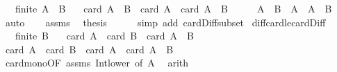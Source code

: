 \begin{isabellebody}
\ \ \ {\isachardoublequoteopen}finite\ {\isacharparenleft}{\kern0pt}A\ {\isasyminter}\ B{\isacharparenright}{\kern0pt}{\isachardoublequoteclose}\isanewline
\ \ \ {\isachardoublequoteopen}card\ {\isacharparenleft}{\kern0pt}A\ {\isacharminus}{\kern0pt}\ B{\isacharparenright}{\kern0pt}\ {\isacharequal}{\kern0pt}\ card\ A\ {\isacharminus}{\kern0pt}\ card\ {\isacharparenleft}{\kern0pt}A\ {\isasyminter}\ B{\isacharparenright}{\kern0pt}{\isachardoublequoteclose}\isanewline
%
\isadelimproof
%
\endisadelimproof
%
\isatagproof
{}\isamarkupfalse%
\ {\isacharminus}{\kern0pt}\isanewline
\ \ \isamarkupfalse%
\ {\isachardoublequoteopen}A\ {\isacharminus}{\kern0pt}\ B\ {\isacharequal}{\kern0pt}\ A\ {\isacharminus}{\kern0pt}\ A\ {\isasyminter}\ B{\isachardoublequoteclose}\ \isamarkupfalse%
\ auto\isanewline
\ \ \isamarkupfalse%
\ assms\ \isamarkupfalse%
\ {\isacharquery}{\kern0pt}thesis\isanewline
\ \ \ \ \isamarkupfalse%
\ {\isacharparenleft}{\kern0pt}simp\ add{\isacharcolon}{\kern0pt}\ card{\isacharunderscore}{\kern0pt}Diff{\isacharunderscore}{\kern0pt}subset{\isacharparenright}{\kern0pt}\isanewline
{}\isamarkupfalse%
%
\endisatagproof
{\isafoldproof}%
%
\isadelimproof
\isanewline
%
\endisadelimproof
\isanewline
{}\isamarkupfalse%
\ diff{\isacharunderscore}{\kern0pt}card{\isacharunderscore}{\kern0pt}le{\isacharunderscore}{\kern0pt}card{\isacharunderscore}{\kern0pt}Diff{\isacharcolon}{\kern0pt}\isanewline
\ \ \ {\isachardoublequoteopen}finite\ B{\isachardoublequoteclose}\isanewline
\ \ \ {\isachardoublequoteopen}card\ A\ {\isacharminus}{\kern0pt}\ card\ B\ {\isasymle}\ card\ {\isacharparenleft}{\kern0pt}A\ {\isacharminus}{\kern0pt}\ B{\isacharparenright}{\kern0pt}{\isachardoublequoteclose}\isanewline
%
\isadelimproof
%
\endisadelimproof
%
\isatagproof
{}\isamarkupfalse%
\ {\isacharminus}{\kern0pt}\isanewline
\ \ \isamarkupfalse%
\ {\isachardoublequoteopen}card\ A\ {\isacharminus}{\kern0pt}\ card\ B\ {\isasymle}\ card\ A\ {\isacharminus}{\kern0pt}\ card\ {\isacharparenleft}{\kern0pt}A\ {\isasyminter}\ B{\isacharparenright}{\kern0pt}{\isachardoublequoteclose}\isanewline
\ \ \ \ \isamarkupfalse%
\ card{\isacharunderscore}{\kern0pt}mono{\isacharbrackleft}{\kern0pt}OF\ assms\ Int{\isacharunderscore}{\kern0pt}lower{}{\isacharcomma}{\kern0pt}\ of\ A{\isacharbrackright}{\kern0pt}\ \isamarkupfalse%
\ arith\isanewline

\end{isabellebody}
